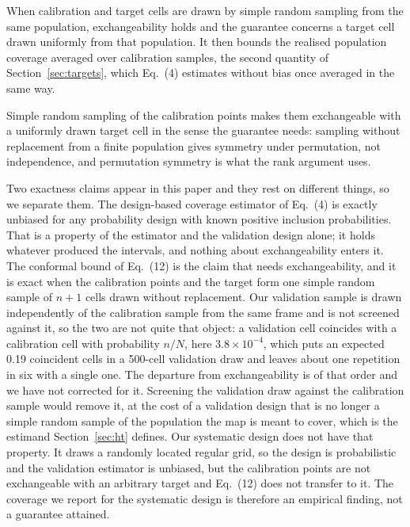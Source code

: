 \documentclass[preprint,12pt,authoryear]{elsarticle}
\begin{document}
When calibration and target cells are drawn by simple random sampling from the
same population, exchangeability holds and the guarantee concerns a target cell
drawn uniformly from that population. It then bounds the realised population
coverage averaged over calibration samples, the second quantity of
Section~\ref{sec:targets}, which Eq.~(4) estimates without bias once averaged
in the same way.

Simple random sampling of the calibration points makes them exchangeable with a
uniformly drawn target cell in the sense the guarantee needs: sampling without
replacement from a finite population gives symmetry under permutation, not
independence, and permutation symmetry is what the rank argument uses.

Two exactness claims appear in this paper and they rest on different things, so
we separate them. The design-based coverage estimator of Eq.~(4) is exactly
unbiased for any probability design with known positive inclusion
probabilities. That is a property of the estimator and the validation design
alone; it holds whatever produced the intervals, and nothing about
exchangeability enters it. The conformal bound of Eq.~(12) is the claim that
needs exchangeability, and it is exact when the calibration points and the
target form one simple random sample of $n+1$ cells drawn without replacement.
Our validation sample is drawn independently of the calibration sample from the
same frame and is not screened against it, so the two are not quite that object:
a validation cell coincides with a calibration cell with probability $n/N$,
here $3.8\times10^{-4}$, which puts an expected 0.19 coincident cells in a
500-cell validation draw and leaves about one repetition in six with a single
one. The departure from exchangeability is of that order and we have not
corrected for it. Screening the validation draw against the calibration sample
would remove it, at the cost of a validation design that is no longer a simple
random sample of the population the map is meant to cover, which is the estimand
Section~\ref{sec:ht} defines. Our
systematic design does not have that property. It draws a randomly located
regular grid, so the design is probabilistic and the validation estimator is
unbiased, but the calibration points are not exchangeable with an arbitrary
target and Eq.~(12) does not transfer to it. The coverage we report for the
systematic design is therefore an empirical finding, not a guarantee attained.
\end{document}
